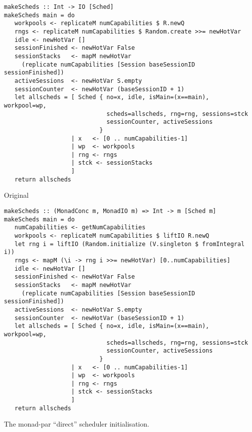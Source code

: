 \begin{listing}
  \begin{sublisting}{\textwidth}
    \begin{verbatim}
makeScheds :: Int -> IO [Sched]
makeScheds main = do
   workpools <- replicateM numCapabilities $ R.newQ
   rngs <- replicateM numCapabilities $ Random.create >>= newHotVar
   idle <- newHotVar []
   sessionFinished <- newHotVar False
   sessionStacks   <- mapM newHotVar
     (replicate numCapabilities [Session baseSessionID sessionFinished])
   activeSessions  <- newHotVar S.empty
   sessionCounter  <- newHotVar (baseSessionID + 1)
   let allscheds = [ Sched { no=x, idle, isMain=(x==main), workpool=wp,
                             scheds=allscheds, rng=rng, sessions=stck
                             sessionCounter, activeSessions
                           }
                   | x   <- [0 .. numCapabilities-1]
                   | wp  <- workpools
                   | rng <- rngs
                   | stck <- sessionStacks
                   ]
   return allscheds
    \end{verbatim}
    \caption{Original}\label{lst:example-parmonad-sched-orig}
  \end{sublisting}

  \vspace{2.5em}

  \begin{sublisting}{\textwidth}
    \begin{verbatim}
makeScheds :: (MonadConc m, MonadIO m) => Int -> m [Sched m]
makeScheds main = do
   numCapabilities <- getNumCapabilities
   workpools <- replicateM numCapabilities $ liftIO R.newQ
   let rng i = liftIO (Random.initialize (V.singleton $ fromIntegral i))
   rngs <- mapM (\i -> rng i >>= newHotVar) [0..numCapabilities]
   idle <- newHotVar []
   sessionFinished <- newHotVar False
   sessionStacks   <- mapM newHotVar
     (replicate numCapabilities [Session baseSessionID sessionFinished])
   activeSessions  <- newHotVar S.empty
   sessionCounter  <- newHotVar (baseSessionID + 1)
   let allscheds = [ Sched { no=x, idle, isMain=(x==main), workpool=wp,
                             scheds=allscheds, rng=rng, sessions=stck
                             sessionCounter, activeSessions
                           }
                   | x   <- [0 .. numCapabilities-1]
                   | wp  <- workpools
                   | rng <- rngs
                   | stck <- sessionStacks
                   ]
   return allscheds
    \end{verbatim}
    \caption{\dejafu{}}\label{lst:example-parmonad-sched-dejafu}
  \end{sublisting}
  \caption{The monad-par ``direct'' scheduler initialisation.}\label{lst:example-parmonad-sched}
\end{listing}

